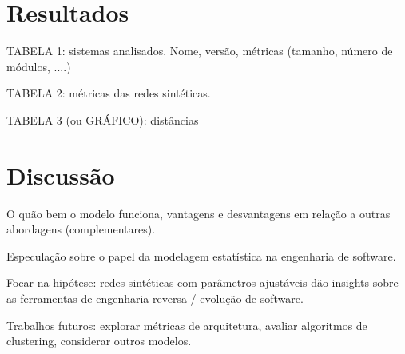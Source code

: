\documentclass{acm_proc_article-sp}
\begin{document}

\section{Resultados} %

TABELA 1: sistemas analisados. Nome, versão, métricas (tamanho, número de módulos, ....)

TABELA 2: métricas das redes sintéticas.

TABELA 3 (ou GRÁFICO): distâncias


\section{Discussão} %






O quão bem o modelo funciona, vantagens e desvantagens em relação a outras abordagens (complementares).

Especulação sobre o papel da modelagem estatística na engenharia de software.

Focar na hipótese: redes sintéticas com parâmetros ajustáveis dão insights sobre as ferramentas de engenharia reversa / evolução de software.




Trabalhos futuros: explorar métricas de arquitetura, avaliar algoritmos de clustering, considerar outros modelos.

%


\end{document}
